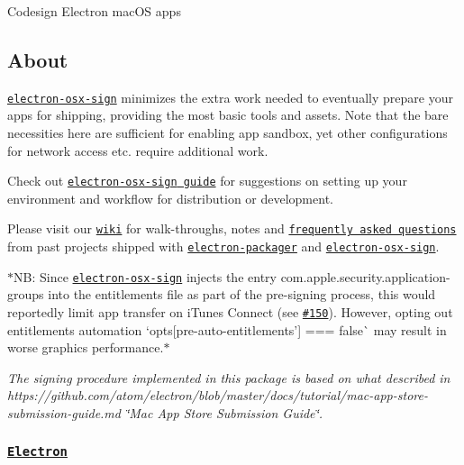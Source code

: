 Codesign Electron mac\+OS apps

\subsection*{About}

\href{https://github.com/electron-userland/electron-osx-sign}{\tt {\ttfamily electron-\/osx-\/sign}} minimizes the extra work needed to eventually prepare your apps for shipping, providing the most basic tools and assets. Note that the bare necessities here are sufficient for enabling app sandbox, yet other configurations for network access etc. require additional work.

Check out \href{https://mintkit.net/electron-userland/electron-osx-sign/guide/}{\tt {\ttfamily electron-\/osx-\/sign} guide} for suggestions on setting up your environment and workflow for distribution or development.

Please visit our \href{https://github.com/electron-userland/electron-osx-sign/wiki}{\tt wiki} for walk-\/throughs, notes and \href{https://github.com/electron-userland/electron-osx-sign/wiki/FAQ}{\tt frequently asked questions} from past projects shipped with \href{https://github.com/electron-userland/electron-packager}{\tt {\ttfamily electron-\/packager}} and \href{https://github.com/electron-userland/electron-osx-sign}{\tt {\ttfamily electron-\/osx-\/sign}}.

$\ast$\+NB\+: Since \href{https://github.com/electron-userland/electron-osx-sign}{\tt {\ttfamily electron-\/osx-\/sign}} injects the entry {\ttfamily com.\+apple.\+security.\+application-\/groups} into the entitlements file as part of the pre-\/signing process, this would reportedly limit app transfer on i\+Tunes Connect (see \href{https://github.com/electron-userland/electron-osx-sign/issues/150}{\tt \#150}). However, opting out entitlements automation `opts\mbox{[}\textquotesingle{}pre-\/auto-\/entitlements'\mbox{]} === false\`{} may result in worse graphics performance.$\ast$

{\itshape The signing procedure implemented in this package is based on what described in https\+://github.com/atom/electron/blob/master/docs/tutorial/mac-\/app-\/store-\/submission-\/guide.\+md \char`\"{}\+Mac App Store Submission Guide\char`\"{}.}

\subsubsection*{\href{https://github.com/electron/electron}{\tt Electron}}

